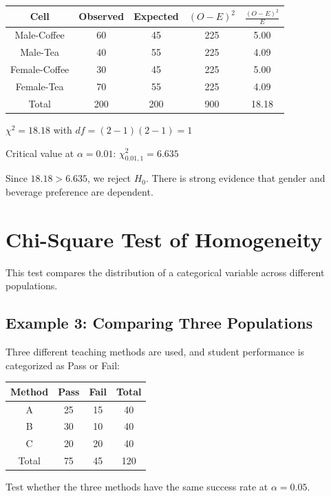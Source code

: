 \documentclass[twoside]{book}
\begin{document}
\begin{center}
\begin{tabular}{|c|c|c|c|c|}
\hline
Cell & Observed & Expected & $(O-E)^2$ & $\frac{(O-E)^2}{E}$ \\
\hline
Male-Coffee & 60 & 45 & 225 & 5.00 \\
Male-Tea & 40 & 55 & 225 & 4.09 \\
Female-Coffee & 30 & 45 & 225 & 5.00 \\
Female-Tea & 70 & 55 & 225 & 4.09 \\
\hline
Total & 200 & 200 & 900 & 18.18 \\
\hline
\end{tabular}
\end{center}

$\chi^2 = 18.18$ with $df = (2-1)(2-1) = 1$

Critical value at $\alpha = 0.01$: $\chi^2_{0.01,1} = 6.635$

Since $18.18 > 6.635$, we reject $H_0$. There is strong evidence that gender and beverage preference are dependent.

\section{Chi-Square Test of Homogeneity}

This test compares the distribution of a categorical variable across different populations.

\subsection{Example 3: Comparing Three Populations}

Three different teaching methods are used, and student performance is categorized as Pass or Fail:

\begin{center}
\begin{tabular}{|c|c|c|c|}
\hline
Method & Pass & Fail & Total \\
\hline
A & 25 & 15 & 40 \\
B & 30 & 10 & 40 \\
C & 20 & 20 & 40 \\
\hline
Total & 75 & 45 & 120 \\
\hline
\end{tabular}
\end{center}

Test whether the three methods have the same success rate at $\alpha = 0.05$.
\end{document}
